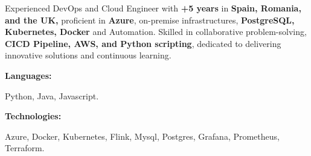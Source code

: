 \documentclass[9pt]{developercv} %
\begin{document}
\begin{minipage}[t]{0.46\textwidth}
    \vspace{-6pt}

    {Experienced DevOps and Cloud Engineer with \textbf{+5 years} in \textbf{Spain,
            Romania, and the UK,} proficient in \textbf{Azure}, on-premise
        infrastructures, \textbf{PostgreSQL, Kubernetes, Docker} and Automation.
        Skilled in collaborative problem-solving, \textbf{CICD
            Pipeline, AWS, and Python scripting}, dedicated to delivering
        innovative solutions and continuous learning.}
\end{minipage}
\hfill %
\begin{minipage}[t]{0.465\textwidth}
    \vspace{-6pt}

    \begin{minipage}[t]{0.2\textwidth}
        \textbf{Languages:}
    \end{minipage}
    \hfill
    \begin{minipage}[t]{0.73\textwidth}
        Python, Java, Javascript.
    \end{minipage}
    \vspace{4mm}

    \begin{minipage}[t]{0.2\textwidth}
        \textbf{Technologies:}
    \end{minipage}
    \hfill
    \begin{minipage}[t]{0.73\textwidth}
        Azure, Docker, Kubernetes, Flink, Mysql, Postgres, Grafana, Prometheus, Terraform.
    \end{minipage}

\end{minipage}
\end{document}
